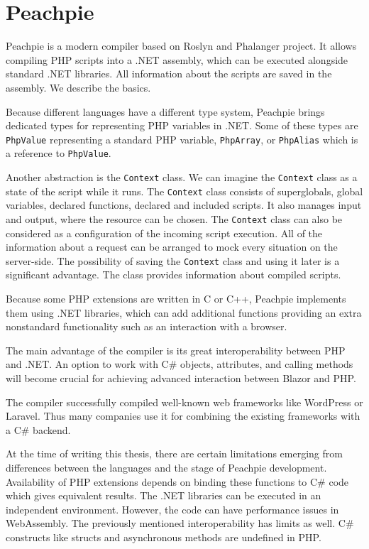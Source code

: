\section{Peachpie}

Peachpie \cite{online:peachpie} is a modern compiler based on Roslyn and Phalanger project.
It allows compiling PHP scripts into a .NET assembly, which can be executed alongside standard .NET libraries.
All information about the scripts are saved in the assembly.
We describe the basics.
\par
Because different languages have a different type system, Peachpie brings dedicated types for representing PHP variables in .NET.
Some of these types are \texttt{PhpValue} representing a standard PHP variable, \texttt{PhpArray}, or \texttt{PhpAlias} which is a reference to \texttt{PhpValue}.
\par
Another abstraction is the \texttt{Context} class.
We can imagine the \texttt{Context} class as a state of the script while it runs.
The \texttt{Context} class consists of superglobals, global variables, declared functions, declared and included scripts.
It also manages input and output, where the resource can be chosen.
The \texttt{Context} class can also be considered as a configuration of the incoming script execution.
All of the information about a request can be arranged to mock every situation on the server-side.
The possibility of saving the \texttt{Context} class and using it later is a significant advantage.
The class provides information about compiled scripts.
\par
Because some PHP extensions are written in C or C++, Peachpie implements them using .NET libraries, which can add additional functions providing an extra nonstandard functionality such as an interaction with a browser.
\par
The main advantage of the compiler is its great interoperability between PHP and .NET.
An option to work with C\# objects, attributes, and calling methods will become crucial for achieving advanced interaction between Blazor and PHP.
\par
The compiler successfully compiled well-known web frameworks like WordPress or Laravel.
Thus many companies use it for combining the existing frameworks with a C\# backend.
\par
At the time of writing this thesis, there are certain limitations emerging from differences between the languages and the stage of Peachpie development.
Availability of PHP extensions depends on binding these functions to C\# code which gives equivalent results. 
The .NET libraries can be executed in an independent environment. 
However, the code can have performance issues in WebAssembly.
The previously mentioned interoperability has limits as well.
C\# constructs like structs and asynchronous methods are undefined in PHP.
